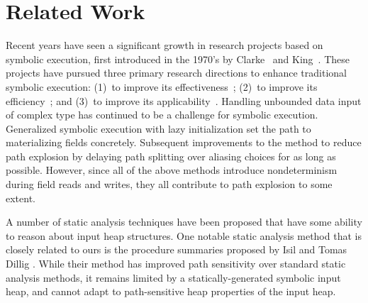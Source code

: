 \section{Related Work}
\label{related}


Recent years have seen a significant growth in research projects based
on symbolic execution, first introduced in the 1970's by
Clarke~\cite{Clarke:76} and King~\cite{King:76}.  These projects have
pursued three primary research directions to enhance traditional
symbolic execution: (1)~to improve its
effectiveness~\cite{Godefroid:PLDI05,Sen:FSE05,CadarEngler05EXE,KiasanKunit,Pasareanu:2011};
(2)~to improve its
efficiency~\cite{AnandETAL2009AbsSymExe,KhurshidSuen2005AbsSymExe,Godefroid:POPL07,Inkumsah:2008,ChangPhD10DataFlowSymbolicExecution,Santelices:ISSTA10,Visser:2012};
and (3)~to improve its
applicability~\cite{Person:FSE08,KhurshidETAL05RepairingStructurally,CsallnerETAL08DySy,SeoETAL06EnergyConsumptionFrameworkDistributedJava,Geldenhuys:2012,Ma:2011}. Handling
unbounded data input of complex type has continued to be a challenge
for symbolic execution.  Generalized symbolic execution \cite{GSE03}
with lazy initialization set the path to materializing fields
concretely. Subsequent improvements to the method
\cite{Deng:2006,Deng:2007} to reduce path explosion by delaying path
splitting over aliasing choices for as long as possible. However,
since all of the above methods introduce nondeterminism during field
reads and writes, they all contribute to path explosion to some
extent.




A number of static analysis techniques have been proposed that have
some ability to reason about input heap structures. One notable static
analysis method that is closely related to ours is the procedure
summaries proposed by Isil and Tomas Dillig \cite{Dillig:2011}.  While
their method has improved path sensitivity over standard static
analysis methods, it remains limited by a statically-generated
symbolic input heap, and cannot adapt to path-sensitive heap
properties of the input heap.

